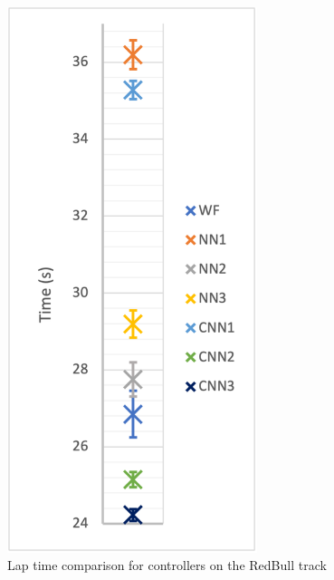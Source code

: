 \begin{figure}
    \centering
    \begin{minipage}{0.45\textwidth}
        \centering
        \includegraphics[width=0.65\textwidth]{Figures/H1_Time.png}
        \caption{Lap time comparison for controllers on the RedBull track}
        \label{h1_time}
    \end{minipage}\hfill
    \begin{minipage}{0.45\textwidth}
        \centering

\end{minipage}
\end{figure}
